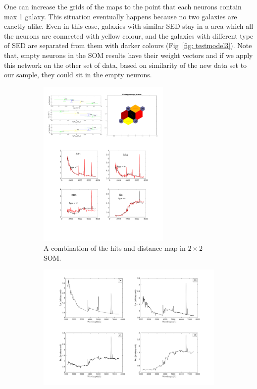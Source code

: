     One can increase the grids of the maps to the point that each neurons contain max 1 galaxy. 
    This situation eventually happens because no two galaxies are exactly alike.
    Even in this case, galaxies with similar SED stay in a area which all the neurons are connected with yellow colour, and the galaxies with different type of SED are separated from them with darker colours (Fig~\ref{fig: testmodel3}). 
    Note that, empty neurons in the SOM results have their weight vectors and if we apply this network on the other set of data, based on similarity of the new data set to our sample, they could sit in the empty neurons.
    \begin{figure}
        \centering
        \begin{subfigure}[b]{0.5\textwidth}
            \centering
            \includegraphics[width=0.7\textwidth]{../images/test_model/2by2_nei3.pdf}
            \caption{A combination of the hits and distance map in $2\times2$ SOM. }
             \label{fig: testmodel2by2}
        \end{subfigure}
        \hfill
        \begin{subfigure}[b]{0.5\textwidth} 
            \centering
            \includegraphics[width=\textwidth]{../images/test_model/SED_total2by2nei3.png}

\end{subfigure}
\end{figure}
